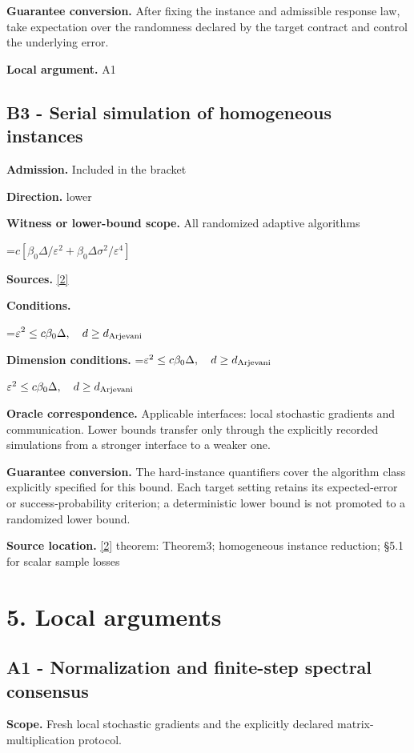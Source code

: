 \documentclass[10pt,a4paper]{article}
\newcommand{\AtlasMath}[1]{\par\begingroup\centering\setbox0=\hbox{$\displaystyle #1$}\ifdim\wd0>1.4\linewidth\typeout{ATLAS WIDE FORMULA: \the\wd0}\fi\ifdim\wd0>\linewidth\resizebox{\linewidth}{!}{\box0}\else\box0\fi\par\endgroup}
\newcommand{\AtlasInlineMath}[1]{\begingroup\setbox0=\hbox{$#1$}\ifdim\wd0>.4\linewidth\endgroup\AtlasMath{#1}\else\endgroup$#1$\fi}
\begin{document}
\textbf{Guarantee conversion.} After fixing the instance and admissible response law, take expectation over the randomness declared by the target contract and control the underlying error.

\textbf{Local argument.} A1

\subsection{B3 - Serial simulation of homogeneous instances}
\textbf{Admission.} Included in the bracket

\textbf{Direction.} lower

\textbf{Witness or lower-bound scope.} All randomized adaptive algorithms

\AtlasMath{c[\beta_0\Delta/\varepsilon^2+\beta_0\Delta\sigma^2/\varepsilon^4]}
\textbf{Sources.} \href{https://arxiv.org/pdf/1912.02365}{[2]}

\textbf{Conditions.} 
\AtlasMath{\varepsilon^2\le c\beta_0\Delta,\quad d\ge d_{\rm Arjevani}}


\textbf{Dimension conditions.} \AtlasInlineMath{\varepsilon^2\le c\beta_0\Delta,\quad d\ge d_{\rm Arjevani}}

\textbf{Oracle correspondence.} Applicable interfaces: local stochastic gradients and communication. Lower bounds transfer only through the explicitly recorded simulations from a stronger interface to a weaker one.

\textbf{Guarantee conversion.} The hard-instance quantifiers cover the algorithm class explicitly specified for this bound. Each target setting retains its expected-error or success-probability criterion; a deterministic lower bound is not promoted to a randomized lower bound.

\textbf{Source location.} \href{https://arxiv.org/pdf/1912.02365}{[2]} theorem: Theorem3; homogeneous instance reduction; §5.1 for scalar sample losses

\section{5. Local arguments}
\subsection{A1 - Normalization and finite-step spectral consensus}
\textbf{Scope.} Fresh local stochastic gradients and the explicitly declared matrix-multiplication protocol.
\end{document}
